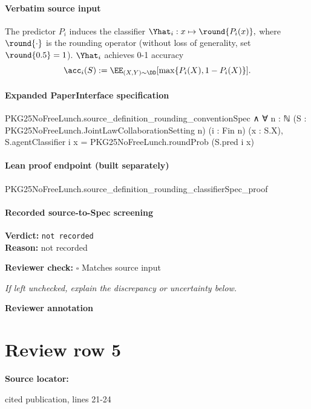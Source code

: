 \documentclass[10pt]{article}
\newcommand{\reviewerbox}{%
  \par\noindent\fbox{\parbox{0.96\linewidth}{\rule{0pt}{0.38in}}}\par
}
\newcommand{\reviewmatch}[1]{%
  \par\noindent\textbf{Reviewer check:} $\square$\; #1\par
  \noindent\emph{If left unchecked, explain the discrepancy or uncertainty below.}\par
}
\begin{document}
\paragraph{Verbatim source input}
\begin{ReviewVerbatim}
The predictor $P_i$ induces the classifier $\Yhat_i: x\mapsto \round{P_i(x)},$ where $\round{\cdot}$ is the rounding operator (without loss of generality, set $\round{0.5}=1$). $\Yhat_i$ achieves 0-1 accuracy
\begin{equation}
    \acc_i(S) := \EE_{(X,Y)\sim \DD}[\max\{P_i(X), 1 - P_i(X)\}].
\end{equation}
\end{ReviewVerbatim}


\paragraph{Expanded PaperInterface specification}
\begin{ReviewVerbatim}
PKG25NoFreeLunch.source_definition_rounding_conventionSpec ∧
  ∀ {n : ℕ} (S : PKG25NoFreeLunch.JointLawCollaborationSetting n) (i : Fin n) (x : S.X),
    S.agentClassifier i x = PKG25NoFreeLunch.roundProb (S.pred i x)
\end{ReviewVerbatim}

\paragraph{Lean proof endpoint (built separately)}\begin{ReviewVerbatim}
PKG25NoFreeLunch.source_definition_rounding_classifierSpec_proof
\end{ReviewVerbatim}

\paragraph{Recorded source-to-Spec screening}
\textbf{Verdict:} \texttt{not recorded}
\\
\textbf{Reason:} not recorded
\reviewmatch{Matches source input}
\noindent\textbf{Reviewer annotation}\par
\reviewerbox
\clearpage
\hypertarget{source-claim-9ca4c6ad86e89895}{}
\section*{Review row 5}
\textbf{Source locator:} {\footnotesize\raggedright cited publication, lines 21-\allowbreak{}24\par}
\end{document}
